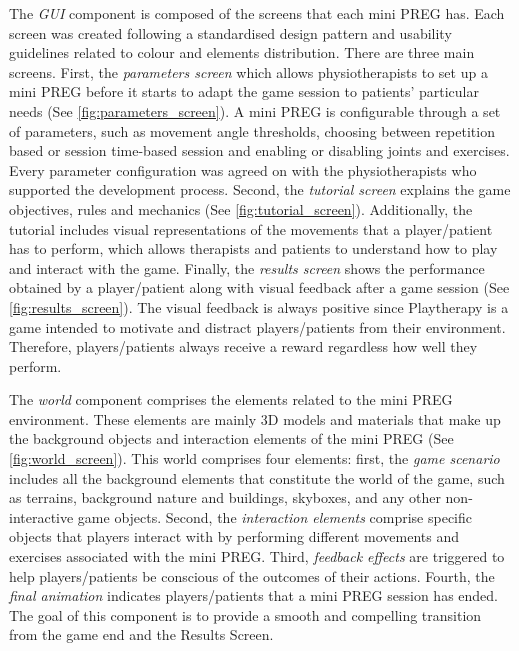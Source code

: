 The \emph{GUI} component is composed of the screens that each mini \ac{PREG} has. Each screen was created following a standardised design pattern and usability guidelines related to colour and elements distribution. There are three main screens. First, the \emph{parameters screen} which allows physiotherapists to set up a mini \ac{PREG} before it starts to adapt the game session to patients' particular needs (See \autoref{fig:parameters_screen}). A mini \ac{PREG} is configurable through a set of parameters, such as movement angle thresholds, choosing between repetition based or session time-based session and enabling or disabling joints and exercises. Every parameter configuration was agreed on with the physiotherapists who supported the development process. Second, the \emph{tutorial screen} explains the game objectives, rules and mechanics (See \autoref{fig:tutorial_screen}). Additionally, the tutorial includes visual representations of the movements that a player/patient has to perform, which allows therapists and patients to understand how to play and interact with the game. Finally, the \emph{results screen} shows the performance obtained by a player/patient along with visual feedback after a game session (See \autoref{fig:results_screen}). The visual feedback is always positive since Playtherapy is a game intended to motivate and distract players/patients from their environment. Therefore, players/patients always receive a reward regardless how well they perform.

The \emph{world} component comprises the elements related to the mini \ac{PREG} environment. These elements are mainly 3D models and materials that make up the background objects and interaction elements of the mini \ac{PREG} (See \autoref{fig:world_screen}). This world comprises four elements: first, the \emph{game scenario} includes all the background elements that constitute the world of the game, such as terrains, background nature and buildings, skyboxes, and any other non-interactive game objects. Second, the \emph{interaction elements} comprise specific objects that players interact with by performing different movements and exercises associated with the mini \ac{PREG}. Third, \emph{feedback effects} are triggered to help players/patients be conscious of the outcomes of their actions. Fourth, the \emph{final animation} indicates players/patients that a mini \ac{PREG} session has ended. The goal of this component is to provide a smooth and compelling transition from the game end and the Results Screen.

